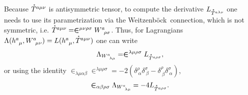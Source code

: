 \documentclass[
10pt, %
a4paper, %
oneside, %
headinclude,footinclude, %
BCOR5mm, %
]{scrartcl}
\newcommand{\tetrsymbol}{h}
\newcommand{\tetr}[2]{\tetrsymbol^{#1}_{\phantom{#1}#2}}
\newcommand{\w}[2]{W^{#1}_{\phantom{#1}#2}}
\newcommand{\We}{Weitzenb\"ock}
\newcommand{\Lag}{\Lambda}	%
\newcommand{\Laghodge}{L}%
\newcommand{\LCsymb}{\bm{\in}}    %
\newcommand{\HDT}[1]{\accentset{\star}{T}^{#1}}
\newcommand{\KD}[2]{\delta^{#1}_{\ #2}}
\begin{document}
Because $ \HDT{a\mu\nu} $ is 
antisymmetric tensor, to compute the derivative $ \Laghodge_{\HDT{a\lambda\nu}} $ one needs to use 
its parametrization via the \We\ connection, which is not symmetric, i.e. $ \HDT{a\mu\nu} = 
\LCsymb^{\mu\nu\rho\sigma} \w{a}{\rho\sigma}$. Thus, for Lagrangians $ 
\Lag(\tetr{a}{\mu},\w{a}{\mu\nu}) = 
\Laghodge(\tetr{a}{\mu},\HDT{a\mu\nu})$ one can write 
\begin{equation}
	\Lag_{\w{a}{\lambda\mu}} = \LCsymb^{\lambda\mu\rho\sigma} \Laghodge_{\HDT{a\rho\sigma}},
\end{equation}
or using the identity $ \LCsymb_{\lambda\mu\alpha\beta}\LCsymb^{\lambda\mu\rho\sigma} = 
-2(\KD{\rho}{\alpha}\KD{\sigma}{\beta} - \KD{\rho}{\beta}\KD{\sigma}{\alpha}) $, 
\begin{equation}\label{eqn.L.T}
	\LCsymb_{\alpha\beta\rho\sigma}\Lag_{\w{a}{\lambda\mu}} = -4 \Laghodge_{\HDT{a\rho\sigma}}.
\end{equation}
\end{document}
